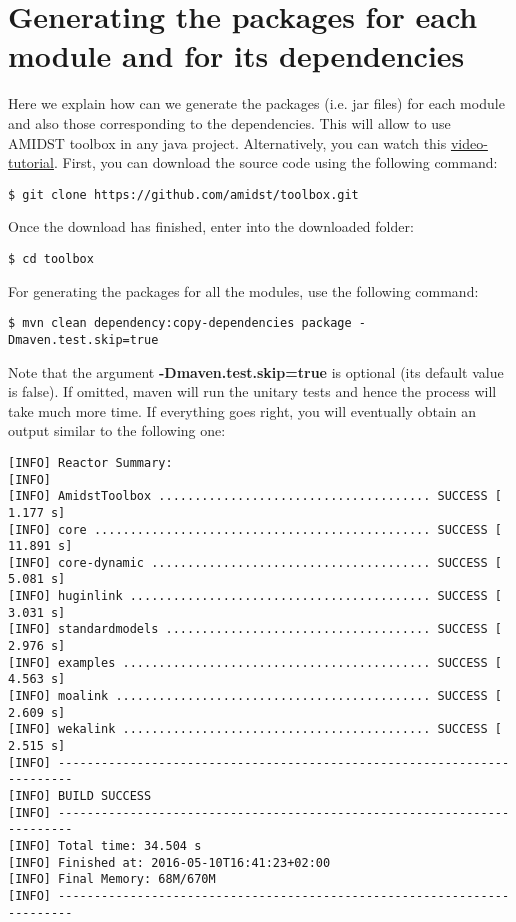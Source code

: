 \documentclass[10pt,a4paper]{article}
\begin{document}
\section{Generating the packages for each module and for
	its
	dependencies}

Here we explain how can we generate the packages (i.e. jar files) for
each module and also those corresponding to the dependencies. This will
allow to use AMIDST toolbox in any java project. Alternatively, you can
watch this
\href{https://www.youtube.com/watch?v=6iLG17UPzX0}{video-tutorial}. First, you can download the source code using the following command:\newline 

\begin{verbatim}
$ git clone https://github.com/amidst/toolbox.git      
\end{verbatim}

Once the download has finished, enter into the downloaded
folder:\newline

\begin{verbatim}
$ cd toolbox     
\end{verbatim}

For generating the packages for all the modules, use the following
command:\newline 

\begin{verbatim}
$ mvn clean dependency:copy-dependencies package -Dmaven.test.skip=true    
\end{verbatim}

Note that the argument \textbf{-Dmaven.test.skip=true} is optional (its
default value is false). If omitted, maven will run the unitary tests
and hence the process will take much more time. If
everything goes right, you will eventually obtain an output similar to
the following one:\newline 

\begin{verbatim}
[INFO] Reactor Summary:
[INFO] 
[INFO] AmidstToolbox ...................................... SUCCESS [  1.177 s]
[INFO] core ............................................... SUCCESS [ 11.891 s]
[INFO] core-dynamic ....................................... SUCCESS [  5.081 s]
[INFO] huginlink .......................................... SUCCESS [  3.031 s]
[INFO] standardmodels ..................................... SUCCESS [  2.976 s]
[INFO] examples ........................................... SUCCESS [  4.563 s]
[INFO] moalink ............................................ SUCCESS [  2.609 s]
[INFO] wekalink ........................................... SUCCESS [  2.515 s]
[INFO] ------------------------------------------------------------------------
[INFO] BUILD SUCCESS
[INFO] ------------------------------------------------------------------------
[INFO] Total time: 34.504 s
[INFO] Finished at: 2016-05-10T16:41:23+02:00
[INFO] Final Memory: 68M/670M
[INFO] ------------------------------------------------------------------------  
\end{verbatim}
\end{document}
